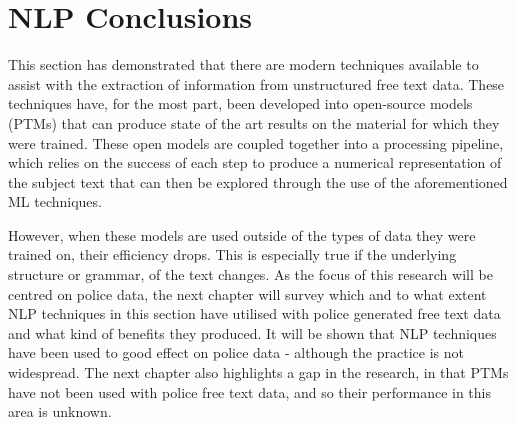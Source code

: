 \section{ NLP Conclusions} This section has demonstrated that there are modern techniques available to assist with the extraction of information from unstructured free text data. These techniques have, for the most part, been developed into open-source models (PTMs) that can produce state of the art results on the material for which they were trained. These open models are coupled together into a processing pipeline, which relies on the success of each step to produce a numerical representation of the subject text that can then be explored through the use of the aforementioned ML techniques.

However, when these models are used outside of the types of data they were trained on, their efficiency drops. This is especially true if the underlying structure or grammar, of the text changes. As the focus of this research will be centred on police data, the next chapter will survey which and to what extent NLP techniques in this section have utilised with police generated free text data and what kind of benefits they produced. It will be shown that NLP techniques have been used to good effect on police data - although the practice is not widespread. The next chapter also highlights a gap in the research, in that PTMs have not been used with police free text data, and so their performance in this area is unknown.

